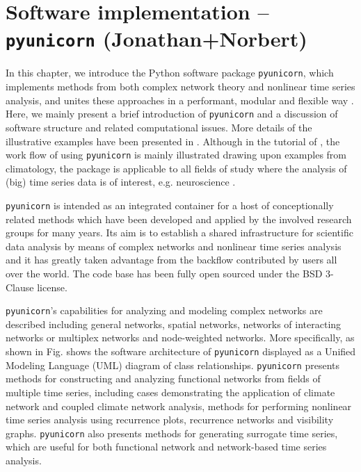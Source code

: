 \section{Software implementation -- \texttt{pyunicorn} {\bf{(Jonathan+Norbert)}}}\label{sec:Software}
	In this chapter, we introduce the Python software package \texttt{pyunicorn}, which implements methods from both complex network theory and nonlinear time series analysis, and unites these approaches in a performant, modular and flexible way \cite{Donges2015}. Here, we mainly present a brief introduction of \texttt{pyunicorn} and a discussion of software structure and related computational issues. More details of the illustrative examples have been presented in \cite{Donges2015}.  Although in the tutorial of \cite{Donges2015}, the work flow of using \texttt{pyunicorn} is mainly illustrated drawing upon examples from climatology, the package is applicable to all fields of study where the analysis of (big) time series data is of interest, e.g. neuroscience \cite{Bullmore2009,Subramaniyam2014,Subramaniyam2015}. 
	
	\texttt{pyunicorn} is intended as an integrated container for a host of conceptionally related methods which have been developed and applied by the involved research groups for many years. Its aim is to establish a shared infrastructure for scientific data analysis by  means of complex networks and nonlinear time series analysis and it has greatly taken advantage from the backflow contributed by users all over the world. The code base has been fully open sourced under the BSD 3-Clause license.

	\texttt{pyunicorn}'s capabilities for analyzing and modeling complex networks are described including general networks, spatial networks, networks of interacting networks or multiplex networks and node-weighted networks. More specifically, {\color{red}as shown in Fig. shows the software architecture of \texttt{pyunicorn} displayed as a Unified Modeling Language (UML) diagram of class relationships.} \texttt{pyunicorn} presents methods for constructing and analyzing functional networks from fields of multiple time series, including cases demonstrating the application of climate network and coupled climate network analysis, methods for performing nonlinear time series analysis using recurrence plots, recurrence networks and visibility graphs. \texttt{pyunicorn} also presents methods for generating surrogate time series, which are useful for both functional network and network-based time series analysis. 
	
